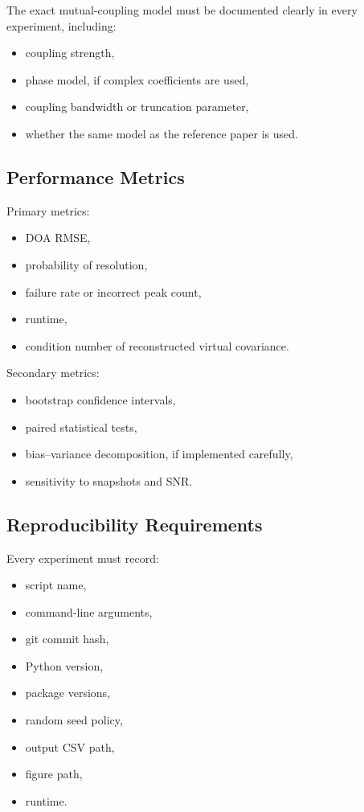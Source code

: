 \documentclass[11pt,letterpaper]{article}
\begin{document}
The exact mutual-coupling model must be documented clearly in every experiment, including:
\begin{itemize}[leftmargin=*]
    \item coupling strength,
    \item phase model, if complex coefficients are used,
    \item coupling bandwidth or truncation parameter,
    \item whether the same model as the reference paper is used.
\end{itemize}

\subsection{Performance Metrics}

Primary metrics:
\begin{itemize}[leftmargin=*]
    \item DOA RMSE,
    \item probability of resolution,
    \item failure rate or incorrect peak count,
    \item runtime,
    \item condition number of reconstructed virtual covariance.
\end{itemize}

Secondary metrics:
\begin{itemize}[leftmargin=*]
    \item bootstrap confidence intervals,
    \item paired statistical tests,
    \item bias--variance decomposition, if implemented carefully,
    \item sensitivity to snapshots and SNR.
\end{itemize}

\subsection{Reproducibility Requirements}

Every experiment must record:
\begin{itemize}[leftmargin=*]
    \item script name,
    \item command-line arguments,
    \item git commit hash,
    \item Python version,
    \item package versions,
    \item random seed policy,
    \item output CSV path,
    \item figure path,
    \item runtime.
\end{itemize}
\end{document}
